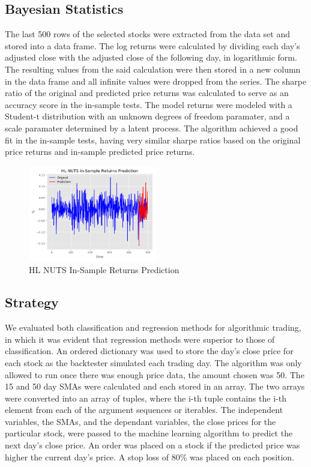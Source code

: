 \documentclass[times]{jtitauth}
\begin{document}
\subsection{Bayesian Statistics}

The last 500 rows of the selected stocks were extracted from the data set and stored into a data frame. The log returns were calculated by dividing each day’s adjusted close with the adjusted close of the following day, in logarithmic form. The resulting values from the said calculation were then stored in a new column in the data frame and all infinite values were dropped from the series. The sharpe ratio of the original and predicted price returns was calculated to serve as an accuracy score in the in-sample tests. The model returns were modeled with a Student-t distribution with an unknown degrees of freedom paramater, and a scale paramater determined by a latent process. The algorithm achieved a good fit in the in-sample tests, having very similar sharpe ratios based on the original price returns and in-sample predicted price returns.

\begin{figure}[!hbp]
\includegraphics[width=0.5\textwidth]{HL-NUTS-In-Sample-Returns-Prediction.png}
\caption{HL NUTS In-Sample Returns Prediction}
\end{figure}

\subsection{Strategy}

We evaluated both classification and regression methods for algorithmic trading, in which it was evident that regression methods were superior to those of classification. An ordered dictionary was used to store the day's close price for each stock as the backtester simulated each trading day. The algorithm was only allowed to run once there was enough price data, the amount chosen was 50. The 15 and 50 day SMAs were calculated and each stored in an array. The two arrays were converted into an array of tuples, where the i-th tuple contains the i-th element from each of the argument sequences or iterables. The independent variables, the SMAs, and the dependant variables, the close prices for the particular stock, were passed to the machine learning algorithm to predict the next day's close price. An order was placed on a stock if the predicted price was higher the current day's price. A stop loss of 80\% was placed on each position. 
\end{document}

